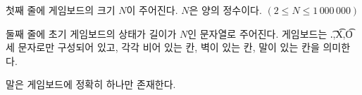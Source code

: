 첫째 줄에 게임보드의 크기 $N$이 주어진다. $N$은 양의 정수이다. $(2 \le N \le 1\,000\,000)$

둘째 줄에 초기 게임보드의 상태가 길이가 $N$인 문자열로 주어진다. 게임보드는 \t{.},\t{X},\t{O} 세 문자로만 구성되어 있고, 각각 비어 있는 칸, 벽이 있는 칸, 말이 있는 칸을 의미한다.

말은 게임보드에 정확히 하나만 존재한다.
